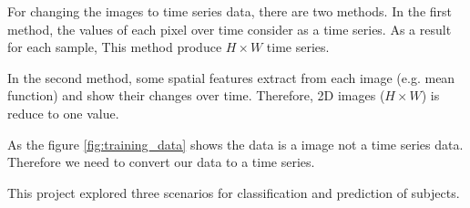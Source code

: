 For changing the images to time series data, there are two methods. In the first method, the values of each pixel over time consider as a time series. As a result for each sample, This method produce $H × W$ time series.

In the second method, some spatial features extract from each image (e.g. mean function) and show their changes over time. Therefore, 2D images ($H × W$) is reduce to one value.

As the figure \ref{fig:training_data} shows the data is a image not a time series data. Therefore we need to convert our data to a time series. 



This project explored three scenarios for classification and prediction of subjects.

